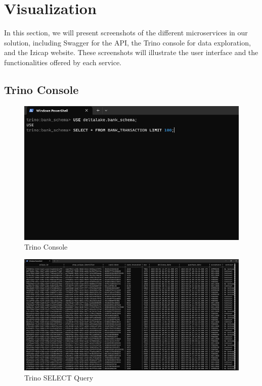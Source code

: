 \section{Visualization}

In this section, we will present screenshots of the different microservices in our solution, including Swagger for the API, the Trino console for data exploration, and the Izicap website. These screenshots will illustrate the user interface and the functionalities offered by each service.

\subsection{Trino Console}

\begin{figure}[H]
\centering
\includegraphics[width=\linewidth]{images/trino-1.png}
\caption{Trino Console}\label{fig:trino-1}
\end{figure}

\begin{figure}[H]
\centering
\includegraphics[width=\linewidth]{images/trino-2.png}
\caption{Trino SELECT Query}\label{fig:trino-2}
\end{figure}

